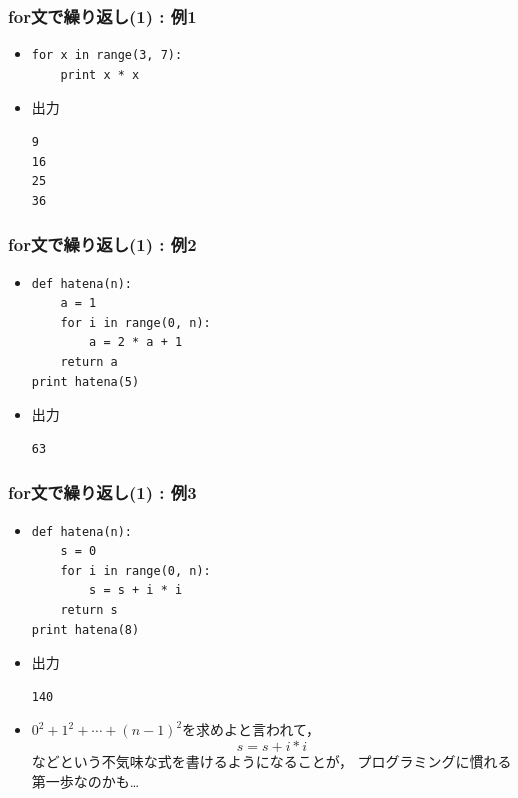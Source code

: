 \documentclass[10pt,dvipdfmx]{beamer}
\begin{document}
\begin{frame}[fragile]
\frametitle{for文で繰り返し(1) : 例1}
\begin{itemize}
\item 
\begin{lstlisting}
for x in range(3, 7):
    print x * x
\end{lstlisting}

\item<2> 出力
\begin{lstlisting}
9
16
25
36
\end{lstlisting}
\end{itemize}
\end{frame}

\begin{frame}[fragile]
\frametitle{for文で繰り返し(1) : 例2}
\begin{itemize}
\item 
\begin{lstlisting}
def hatena(n):
    a = 1
    for i in range(0, n):
        a = 2 * a + 1
    return a
print hatena(5)
\end{lstlisting}

\item<2> 出力
\begin{lstlisting}
63
\end{lstlisting}
\end{itemize}
\end{frame}


\begin{frame}[fragile]
\frametitle{for文で繰り返し(1) : 例3}
\begin{itemize}
\item 
\begin{lstlisting}
def hatena(n):
    s = 0
    for i in range(0, n):
        s = s + i * i
    return s
print hatena(8)
\end{lstlisting}

\item<2> 出力
\begin{lstlisting}
140
\end{lstlisting}

\item 
{\scriptsize $0^2 + 1^2 + \cdots + (n-1)^2$を求めよと言われて，
\[ s = s + i * i \]
などという不気味な式を書けるようになることが，
プログラミングに慣れる第一歩なのかも\ldots}

\end{itemize}
\end{frame}
\end{document}
